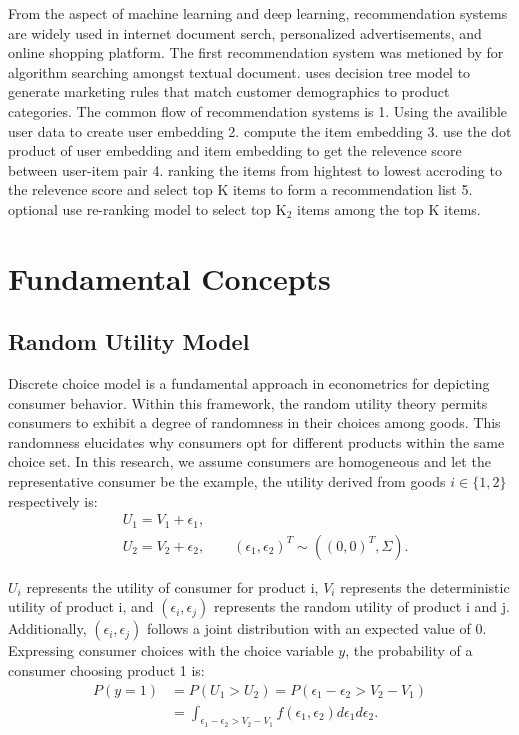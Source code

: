 \documentclass[12pt]{article}
\theoremstyle{definition}
\begin{document}
\begin{sloppypar}
From the aspect of machine learning and deep learning, recommendation systems are widely used in internet document serch, personalized advertisements, and online shopping platform. The first recommendation system was metioned by \textcite{1574231873785747328} for algorithm searching amongst textual document. \textcite{5731f882-9c11-372e-a87e-2f3238e61d42} uses decision tree model to generate marketing rules that match customer demographics to product categories. The common flow of recommendation systems is 1. Using the availible user data to create user embedding 2. compute the item embedding 3. use the dot product of user embedding and item embedding to get the relevence score between user-item pair 4. ranking the items from hightest to lowest accroding to the relevence score and select top K items to form a recommendation list 5. optional use re-ranking model to select top $\mathrm{K}_2$ items among the top K items. 

\section{Fundamental Concepts}
\subsection{Random Utility Model}
Discrete choice model is a fundamental approach in econometrics for depicting consumer behavior. Within this framework, the random utility theory permits consumers to exhibit a degree of randomness in their choices among goods. This randomness elucidates why consumers opt for different products within the same choice set. In this research, we assume consumers are homogeneous and let the representative consumer be the example, the utility derived from goods $i \in \{1, 2\}$ respectively is:
\begin{align*}
    &U_{1} = V_{1} + \epsilon_{1},\\
    &U_{2} = V_{2} + \epsilon_{2}, \qquad (\epsilon_{1}, \epsilon_{2})^T \sim ((0,0)^T, \Sigma).
\end{align*}

$U_{i}$ represents the utility of consumer for product i, $V_{i}$ represents the deterministic utility of product i, and $(\epsilon_{i}, \epsilon_{j})$ represents the random utility of product i and j. Additionally, $(\epsilon_{i}, \epsilon_{j})$ follows a joint distribution with an expected value of 0. Expressing consumer choices with the choice variable $y$, the probability of a consumer choosing product 1 is:
\begin{align*}
    P(y=1) &= P(U_{1} > U_{2}) = P(\epsilon_{1} - \epsilon_{2} > V_{2} - V_{1}) \\ 
    &= \int_{\epsilon_{1} - \epsilon_{2} > V_{2} - V_{1}} f(\epsilon_{1}, \epsilon_{2}) d\epsilon_{1} d\epsilon_{2}.
\end{align*}


\end{sloppypar}
\end{document}
